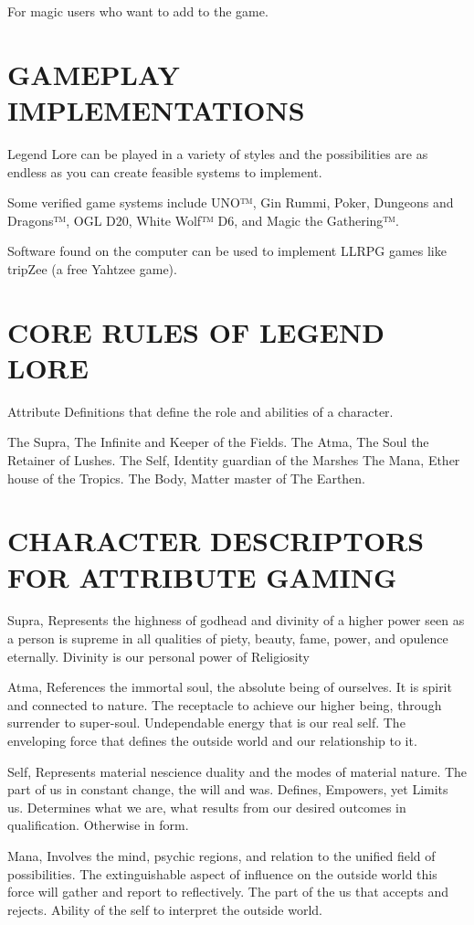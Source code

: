 \documentclass{article}
\begin{document}
For magic users who want to add to the game.

\section{GAMEPLAY IMPLEMENTATIONS}

	Legend Lore can be played in a variety of styles and the possibilities are as endless as you can
create feasible systems to implement.

	Some verified game systems include UNO™, Gin Rummi, Poker, Dungeons and Dragons™,
OGL D20, White Wolf™ D6, and Magic the Gathering™.

	Software found on the computer can be used to implement LLRPG games like tripZee (a free
Yahtzee game).

\section{CORE RULES OF LEGEND LORE}

	Attribute Definitions that define the role and abilities of a character.

The Supra, The Infinite and Keeper of the Fields.
The Atma, The Soul the Retainer of Lushes.
The Self, Identity guardian of the Marshes
The Mana, Ether house of the Tropics.
The Body, Matter master of The Earthen.

\section{CHARACTER DESCRIPTORS FOR ATTRIBUTE GAMING}

Supra, Represents the highness of godhead and divinity of a higher power seen as a person is
supreme in all qualities of piety, beauty, fame, power, and opulence eternally. Divinity is our
personal power of Religiosity

Atma, References the immortal soul, the absolute being of ourselves. It is spirit and connected
to nature. The receptacle to achieve our higher being, through surrender to super-soul.
Undependable energy that is our real self. The enveloping force that defines the outside world
and our relationship to it.

Self, Represents material nescience duality and the modes of material nature. The part of us in
constant change, the will and was. Defines, Empowers, yet Limits us. Determines what we are,
what results from our desired outcomes in qualification. Otherwise in form.

Mana, Involves the mind, psychic regions, and relation to the unified field of possibilities. The
extinguishable aspect of influence on the outside world this force will gather and report to
reflectively. The part of the us that accepts and rejects. Ability of the self to interpret the outside
world.
\end{document}
